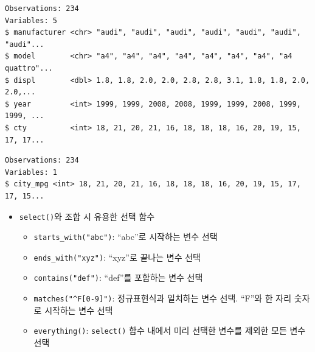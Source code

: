 \documentclass[
  11pt,
]{krantz}
\newenvironment{Shaded}{\begin{snugshade}}{\end{snugshade}}
\newcommand{\CommentTok}[1]{\textcolor[rgb]{0.37,0.37,0.37}{\textit{#1}}}
\newcommand{\DataTypeTok}[1]{\textcolor[rgb]{0.27,0.27,0.27}{#1}}
\newcommand{\KeywordTok}[1]{\textcolor[rgb]{0.27,0.27,0.27}{\textbf{#1}}}
\newcommand{\NormalTok}[1]{#1}
\newcommand{\OperatorTok}[1]{\textcolor[rgb]{0.43,0.43,0.43}{\textbf{#1}}}
\newcommand{\StringTok}[1]{\textcolor[rgb]{0.5,0.5,0.5}{#1}}
\providecommand{\tightlist}{%
  \setlength{\itemsep}{0pt}\setlength{\parskip}{0pt}}
\begin{document}
\begin{Shaded}
\end{Shaded}

\begin{verbatim}
Observations: 234
Variables: 5
$ manufacturer <chr> "audi", "audi", "audi", "audi", "audi", "audi", "audi"...
$ model        <chr> "a4", "a4", "a4", "a4", "a4", "a4", "a4", "a4 quattro"...
$ displ        <dbl> 1.8, 1.8, 2.0, 2.0, 2.8, 2.8, 3.1, 1.8, 1.8, 2.0, 2.0,...
$ year         <int> 1999, 1999, 2008, 2008, 1999, 1999, 2008, 1999, 1999, ...
$ cty          <int> 18, 21, 20, 21, 16, 18, 18, 18, 16, 20, 19, 15, 17, 17...
\end{verbatim}

\begin{Shaded}
\end{Shaded}

\begin{verbatim}
Observations: 234
Variables: 1
$ city_mpg <int> 18, 21, 20, 21, 16, 18, 18, 18, 16, 20, 19, 15, 17, 17, 15...
\end{verbatim}

\normalsize

\begin{itemize}
\item
  \texttt{select()}와 조합 시 유용한 선택 함수

  \begin{itemize}
  \tightlist
  \item
    \texttt{starts\_with("abc")}: ``abc''로 시작하는 변수 선택
  \item
    \texttt{ends\_with("xyz")}: ``xyz''로 끝나는 변수 선택
  \item
    \texttt{contains("def")}: ``def''를 포함하는 변수 선택
  \item
    \texttt{matches("\^{}F{[}0-9{]}")}: 정규표현식과 일치하는 변수 선택. ``F''와 한 자리 숫자로 시작하는 변수 선택
  \item
    \texttt{everything()}: \texttt{select()} 함수 내에서 미리 선택한 변수를 제외한 모든 변수 선택
  \end{itemize}
\end{itemize}
\end{document}
